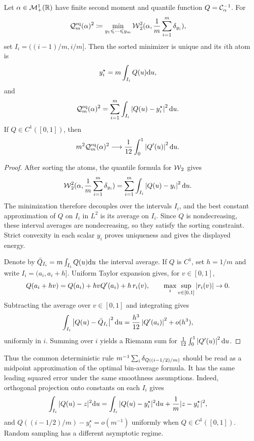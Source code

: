 \begin{prop}\label{prop-1d-equal-weight-quantization}
	Let $\alpha\in\mathcal{M}_+^1(\mathbb{R})$ have finite second moment and quantile function $Q=\mathcal{C}_{\alpha}^{-1}$. For
		\[
			\mathcal{Q}^{\mathrm{eq}}_m(\alpha)^2
			\coloneqq
			\min_{y_1\leqslant\cdots\leqslant y_m}
			\operatorname{\mathcal{W}}_2^2(\alpha,\frac1m\sum_{i=1}^m\delta_{y_i}),
	\]
	set $I_i=((i-1)/m,i/m]$. Then the sorted minimizer is unique and its $i$th atom is
	\[
		y_i^\star
		=
		m\int_{I_i} Q(u)\mathrm{d} u,
	\]
	and
	\[
		\mathcal{Q}^{\mathrm{eq}}_m(\alpha)^2
		=
		\sum_{i=1}^m
		\int_{I_i}
		\left\lvert Q(u)-y_i^\star\right\rvert^2\mathrm{d} u.
	\]
	If $Q\in C^1([0,1])$, then
	\[
		m^2\mathcal{Q}^{\mathrm{eq}}_m(\alpha)^2
		\longrightarrow
		\frac1{12}\int_0^1\left\lvert Q'(u)\right\rvert^2\mathrm{d} u.
	\]
\end{prop}
\begin{proof}
	After sorting the atoms, the quantile formula for $\operatorname{\mathcal{W}}_2$ gives
		\[
			\operatorname{\mathcal{W}}_2^2(\alpha,\frac1m\sum_{i=1}^m\delta_{y_i})
		=
		\sum_{i=1}^m
		\int_{I_i}\left\lvert Q(u)-y_i\right\rvert^2\mathrm{d} u.
	\]
	The minimization therefore decouples over the intervals $I_i$, and the best constant approximation of $Q$ on $I_i$ in $L^2$ is its average on $I_i$. Since $Q$ is nondecreasing, these interval averages are nondecreasing, so they satisfy the sorting constraint. Strict convexity in each scalar $y_i$ proves uniqueness and gives the displayed energy.

	Denote by $\bar Q_{I_i}=m\int_{I_i}Q(u)\mathrm{d} u$ the interval average. If $Q$ is $C^1$, set $h=1/m$ and write $I_i=(a_i,a_i+h]$. Uniform Taylor expansion gives, for $v\in[0,1]$,
	\[
		Q(a_i+hv)=Q(a_i)+hvQ'(a_i)+h\,r_i(v),
		\qquad
		\max_i\sup_{v\in[0,1]}\left\lvert r_i(v)\right\rvert\to0.
	\]
	Subtracting the average over $v\in[0,1]$ and integrating gives
	\[
		\int_{I_i}\left\lvert Q(u)-\bar Q_{I_i}\right\rvert^2\mathrm{d} u
		=
		\frac{h^3}{12}\left\lvert Q'(a_i)\right\rvert^2+o(h^3),
	\]
	uniformly in $i$. Summing over $i$ yields a Riemann sum for $\frac1{12}\int_0^1\left\lvert Q'(u)\right\rvert^2\mathrm{d} u$.
\end{proof}

Thus the common deterministic rule $m^{-1}\sum_i\delta_{Q((i-1/2)/m)}$ should be read as a midpoint approximation of the optimal bin-average formula. It has the same leading squared error under the same smoothness assumptions. Indeed, orthogonal projection onto constants on each $I_i$ gives
\[
	\int_{I_i}|Q(u)-z|^2\mathrm{d} u
	=
	\int_{I_i}|Q(u)-y_i^\star|^2\mathrm{d} u
	+
	\frac1m|z-y_i^\star|^2,
\]
and $Q((i-1/2)/m)-y_i^\star=o(m^{-1})$ uniformly when $Q\in C^1([0,1])$. Random sampling has a different asymptotic regime.

